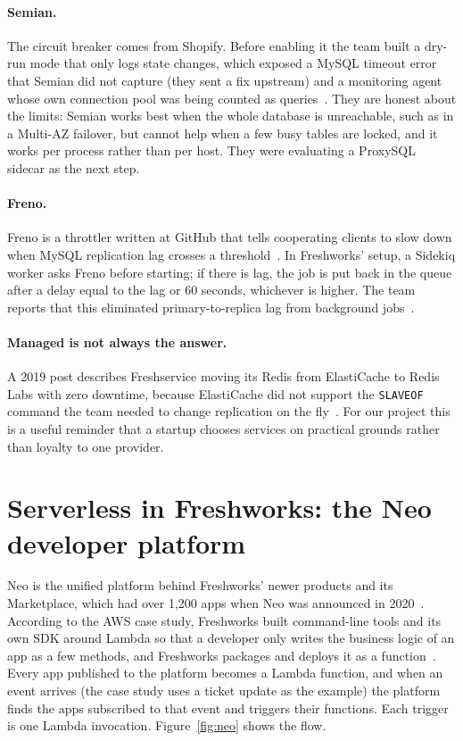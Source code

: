\documentclass[10pt,a4paper]{article}
\newcommand{\code}[1]{\texttt{#1}}
\begin{document}
\paragraph{Semian.} The circuit breaker comes from Shopify. Before enabling it the team built a dry-run mode that only logs state changes, which exposed a MySQL timeout error that Semian did not capture (they sent a fix upstream) and a monitoring agent whose own connection pool was being counted as queries~\cite{kumar2020}. They are honest about the limits: Semian works best when the whole database is unreachable, such as in a Multi-AZ failover, but cannot help when a few busy tables are locked, and it works per process rather than per host. They were evaluating a ProxySQL sidecar as the next step.

\paragraph{Freno.} Freno is a throttler written at GitHub that tells cooperating clients to slow down when MySQL replication lag crosses a threshold~\cite{freno}. In Freshworks' setup, a Sidekiq worker asks Freno before starting; if there is lag, the job is put back in the queue after a delay equal to the lag or 60 seconds, whichever is higher. The team reports that this eliminated primary-to-replica lag from background jobs~\cite{bgjobs}.

\paragraph{Managed is not always the answer.} A 2019 post describes Freshservice moving its Redis from ElastiCache to Redis Labs with zero downtime, because ElastiCache did not support the \code{SLAVEOF} command the team needed to change replication on the fly~\cite{redis19}. For our project this is a useful reminder that a startup chooses services on practical grounds rather than loyalty to one provider.

\section{Serverless in Freshworks: the Neo developer platform}\label{sec:neo}

Neo is the unified platform behind Freshworks' newer products and its Marketplace, which had over 1{,}200 apps when Neo was announced in 2020~\cite{neo}. According to the AWS case study, Freshworks built command-line tools and its own SDK around Lambda so that a developer only writes the business logic of an app as a few methods, and Freshworks packages and deploys it as a function~\cite{awslambda}. Every app published to the platform becomes a Lambda function, and when an event arrives (the case study uses a ticket update as the example) the platform finds the apps subscribed to that event and triggers their functions. Each trigger is one Lambda invocation. Figure~\ref{fig:neo} shows the flow.
\end{document}
